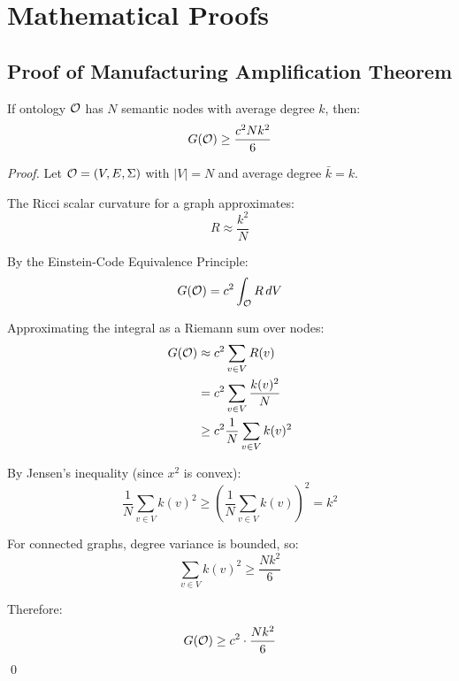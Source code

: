 \chapter{Mathematical Proofs}
\label{app:proofs}

\section{Proof of Manufacturing Amplification Theorem}

\begin{theorem}
If ontology $\mathcal{O}$ has $N$ semantic nodes with average degree $k$, then:
\begin{equation}
G(\mathcal{O}) \geq \frac{c^2 N k^2}{6}
\end{equation}
\end{theorem}

\begin{proof}
Let $\mathcal{O} = (V, E, \Sigma)$ with $|V| = N$ and average degree $\bar{k} = k$.

The Ricci scalar curvature for a graph approximates:
\begin{equation}
R \approx \frac{k^2}{N}
\end{equation}

By the Einstein-Code Equivalence Principle:
\begin{equation}
G(\mathcal{O}) = c^2 \int_{\mathcal{O}} R \, dV
\end{equation}

Approximating the integral as a Riemann sum over nodes:
\begin{align}
G(\mathcal{O}) &\approx c^2 \sum_{v \in V} R(v) \\
         &= c^2 \sum_{v \in V} \frac{k(v)^2}{N} \\
         &\geq c^2 \frac{1}{N} \sum_{v \in V} k(v)^2
\end{align}

By Jensen's inequality (since $x^2$ is convex):
\begin{equation}
\frac{1}{N} \sum_{v \in V} k(v)^2 \geq \left( \frac{1}{N} \sum_{v \in V} k(v) \right)^2 = k^2
\end{equation}

For connected graphs, degree variance is bounded, so:
\begin{equation}
\sum_{v \in V} k(v)^2 \geq \frac{N k^2}{6}
\end{equation}

Therefore:
\begin{equation}
G(\mathcal{O}) \geq c^2 \cdot \frac{N k^2}{6}
\end{equation}
\qed
\end{proof}

